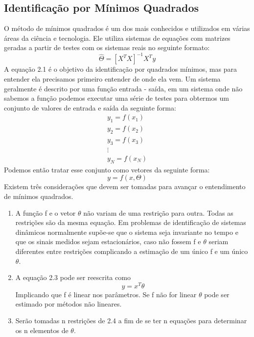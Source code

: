 \subsection{Identificação por Mínimos Quadrados}
O método de mínimos quadrados é um dos mais conhecidos e utilizados em várias áreas da ciência e tecnologia. Ele utiliza sistemas de equações com matrizes geradas a partir de testes com os sistemas reais no seguinte formato:
\begin{equation}
	\hat{\Theta}=[X^TX]^{-1}X^Ty
\end{equation}
A equação 2.1 é o objetivo da identificação por quadrados mínimos, mas para entender ela precisamos primeiro entender de onde ela vem.
\newline 
Um sistema geralmente é descrito por uma função entrada - saída, em um sistema onde não sabemos a função podemos executar uma série de testes para obtermos um conjunto de valores de entrada e saída da seguinte forma:
\begin{equation}
\begin{array}{c}
y_1=f(x_1) \\
y_2=f(x_2) \\
y_3=f(x_3) \\
\vdots \\
y_N=f(x_N)
\end{array}
\end{equation}
Podemos então tratar esse conjunto como vetores da seguinte forma:
\begin{equation}
y=f(x,\Theta)
\end{equation}
Existem três considerações que devem ser tomadas para avançar o entendimento de mínimos quadrados.
\begin{enumerate}
	\item A função f e o vetor $\theta$ não variam de uma restrição para outra. Todas as restrições são da mesma equação. Em problemas de identificação de sistemas dinâmicos normalmente supõe-se que o sistema seja invariante no tempo e que os sinais medidos sejam estacionários, caso não fossem f e $\theta$ seriam diferentes entre restrições complicando a estimação de um único f e um único $\theta$.
	\item A equação 2.3 pode ser reescrita como
	\begin{equation}
	y=x^T \theta
	\end{equation}
	Implicando que f é linear nos parâmetros. Se f não for linear $\theta$ pode ser estimado por métodos não lineares.
	\item Serão tomadas n restrições de 2.4 a fim de se ter n equações para determinar os n elementos de $\theta$.
\end{enumerate}

